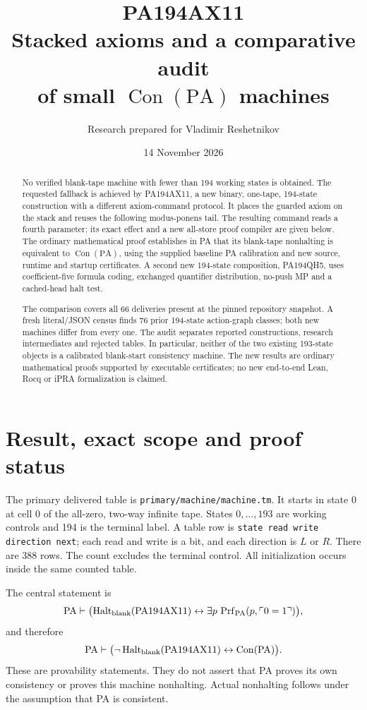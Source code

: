 \documentclass[11pt,letterpaper]{article}
\title{\textbf{PA194AX11}\\[0.3em]\Large Stacked axioms and a comparative audit\\of small $\operatorname{Con}(\mathrm{PA})$ machines}
\author{Research prepared for Vladimir Reshetnikov}
\date{14 November 2026}
\newcommand{\file}[1]{\nolinkurl{#1}}
\begin{document}
\maketitle
\begin{abstract}
No verified blank-tape machine with fewer than 194 working states is obtained.
The requested fallback is achieved by PA194AX11, a new binary, one-tape,
194-state construction with a different axiom-command protocol. It places
the guarded axiom on the stack and reuses the following modus-ponens tail.
The resulting command reads a fourth parameter; its exact effect and a new
all-store proof compiler are given below. The ordinary mathematical proof
establishes in PA that its blank-tape nonhalting is equivalent to
$\operatorname{Con}(\mathrm{PA})$, using the supplied baseline PA calibration
and new source, runtime and startup certificates. A second new 194-state
composition, PA194QH5, uses coefficient-five formula coding, exchanged
quantifier distribution, no-push MP and a cached-head halt test.

The comparison covers all 66 deliveries present at the pinned repository
snapshot. A fresh literal/JSON census finds 76 prior 194-state action-graph
classes; both new machines differ from every one. The audit separates
reported constructions, research intermediates and rejected tables. In
particular, neither of the two existing 193-state objects is a calibrated
blank-start consistency machine. The new results are ordinary mathematical
proofs supported by executable certificates; no new end-to-end Lean, Rocq
or iPRA formalization is claimed.
\end{abstract}
\tableofcontents
\newpage

\section{Result, exact scope and proof status}

The primary delivered table is \file{primary/machine/machine.tm}.
It starts in state 0 at cell 0 of the all-zero, two-way infinite tape.
States $0,\ldots,193$ are working controls and 194 is the terminal label.
A table row is \texttt{state read write direction next}; each read and
write is a bit, and each direction is $L$ or $R$. There are 388 rows.
The count excludes the terminal control. All initialization occurs inside
the same counted table.

The central statement is
\[
 \mathrm{PA}\vdash
 \bigl(\operatorname{Halt}_{\rm blank}(\mathrm{PA194AX11})
       \leftrightarrow
       \exists p\,\operatorname{Prf}_{\rm PA}(p,\ulcorner0=1\urcorner)\bigr),
\]
and therefore
\[
 \mathrm{PA}\vdash
 \bigl(\neg\operatorname{Halt}_{\rm blank}(\mathrm{PA194AX11})
       \leftrightarrow\operatorname{Con}(\mathrm{PA})\bigr).
\]
These are provability statements. They do not assert that PA proves its
own consistency or proves this machine nonhalting. Actual nonhalting
follows under the assumption that PA is consistent.
\end{document}
